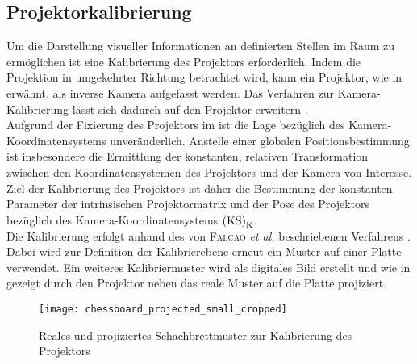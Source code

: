 \prever{
}

\subsection{Projektorkalibrierung}
\label{chap.projcalib}
Um die Darstellung visueller Informationen an definierten Stellen im Raum zu ermöglichen ist eine Kalibrierung des Projektors erforderlich. Indem die Projektion in umgekehrter Richtung betrachtet wird, kann ein Projektor, wie in  erwähnt, als inverse Kamera aufgefasst werden. Das Verfahren zur Kamera-Kalibrierung lässt sich dadurch auf den Projektor erweitern \cite{Falcao2008}.\\

Aufgrund der Fixierung des Projektors im \kps{} ist die Lage bezüglich des Kamera-Koordinatensystems unveränderlich. Anstelle einer globalen Positionsbestimmung ist insbesondere die Ermittlung der konstanten, relativen Transformation zwischen den Koordinatensystemen des Projektors und der Kamera von Interesse. Ziel der Kalibrierung des Projektors ist daher die Bestimmung der konstanten Parameter der intrinsischen Projektormatrix und der Pose des Projektors bezüglich des Kamera-Koordinatensystems ${\mathrm{(KS)}}_{\mathrm{K}}$.\\

Die Kalibrierung erfolgt anhand des von \textsc{Falcao} \textit{et al.} beschriebenen Verfahrens \cite{Falcao2008}. Dabei wird zur Definition der Kalibrierebene erneut ein Muster auf einer Platte verwendet. Ein weiteres Kalibriermuster wird als digitales Bild erstellt und wie in  gezeigt durch den Projektor neben das reale Muster auf die Platte projiziert.

\begin{figure}[ht]
	\begin{center}
		\texttt{[image: chessboard\_projected\_small\_cropped]}
		\caption{Reales und projiziertes Schachbrettmuster zur Kalibrierung des Projektors}
		\label{fig.projcalib}
	\end{center}
\end{figure}


